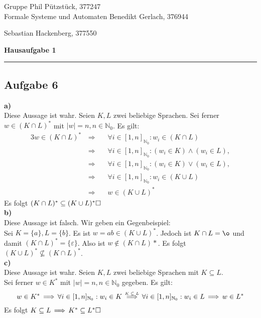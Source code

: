 \documentclass[a4paper,graphics,11pt]{article}
\newcommand{\aufgabe}[1]{\subsection*{Aufgabe #1}}
\newcommand{\up}[2]{\mathrel{\overset{\makebox[0pt]{\mbox{\normalfont\tiny #2}}}{#1}}}
\begin{document}
\noindent Gruppe              \hfill Phil Pützstück, 377247\\
\noindent Formale Systeme und Automaten \hfill Benedikt Gerlach, 376944\\
\strut\hfill Sebastian Hackenberg, 377550\\
\begin{center}
	\LARGE{\textbf{Hausaufgabe 1}}
\end{center}
\begin{center}
\rule[0.1ex]{\textwidth}{1pt}
\end{center}

\aufgabe{6}
\textbf{a)}\\[2pt]
Diese Aussage ist wahr. Seien $K, L$ zwei beliebige Sprachen. Sei ferner $w \in (K \cap L)^*$
mit $|w| = n, n \in \mathbb{N}_0$. Es gilt:
\begin{alignat*}{3}
	w \in (K \cap L)^*
	&\,\Longrightarrow\,&& \forall i \in [1,n]_{\mathbb{N}_0} : w_i \in (K \cap L)\\[1pt]
	&\,\Longrightarrow\,&& \forall i \in [1,n]_{\mathbb{N}_0} : (w_i \in K) \land (w_i \in L),\\[1pt]
	&\,\Longrightarrow\,&& \forall i \in [1,n]_{\mathbb{N}_0} : (w_i \in K) \lor (w_i \in L),\\[1pt]
	&\,\Longrightarrow\,&& \forall i \in [1,n]_{\mathbb{N}_0} : w_i \in (K \cup L) \\[1pt]
	&\,\Longrightarrow\,&& w \in (K \cup L)^*
\end{alignat*}
Es folgt $(K \cap L)^* \subseteq (K \cup L)^*\hfill\square$\\

\textbf{b)}\\[2pt]
Diese Aussage ist falsch. Wir geben ein Gegenbeispiel:\\[2pt]
Sei $K = \{a\}, L = \{b\}$. Es ist $w = ab \in (K \cup L)^*$. Jedoch ist $K \cap L =\o$ und
damit $(K \cap L)^* = \{\varepsilon\}$. Also ist $w \notin (K \cap L)*$.
Es folgt $(K \cup L)^* \nsubseteq (K \cap L)^*$.\\

\textbf{c)}\\[2pt]
Diese Aussage ist wahr. Seien $K, L$ zwei beliebige Sprachen mit $K \subseteq L$. \\
Sei ferner $w \in K^*$ mit $|w| = n, n \in \mathbb{N}_0$ gegeben. Es gilt:
$$
	w \in K^*
	\,\Longrightarrow\, \forall i \in [1,n]_{\mathbb{N}_0} : w_i \in K
	\up{\ \Longrightarrow\ }{$K \subseteq L$} \forall i \in [1,n]_{\mathbb{N}_0} : w_i \in L
	\,\Longrightarrow\, w \in L^*
$$
Es folgt $K \subseteq L \,\Longrightarrow\, K^* \subseteq L^*\hfill\square$\\
\end{document}

